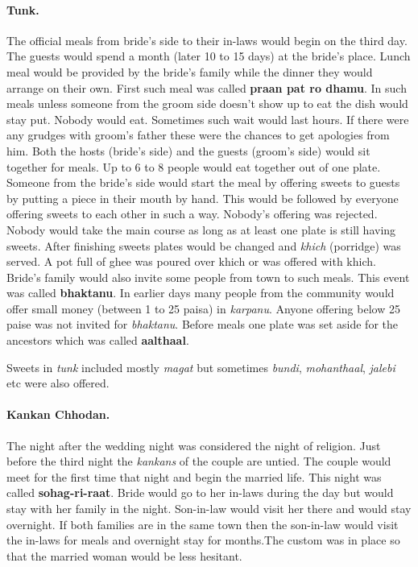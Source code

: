\paragraph{Tunk.} The official meals from bride's side to their in-laws would
begin on the third day. The guests would spend a month (later 10 to 15 days) at
the bride's place. Lunch meal would be provided by the bride's family while the
dinner they would arrange on their own. First such meal was called
\textbf{praan pat ro dhamu}. In such meals unless someone from the groom side
doesn't show up to eat the dish would stay put. Nobody would eat. Sometimes
such wait would last hours. If there were any grudges with groom's father these
were the chances to get apologies from him. Both the hosts (bride's side) and
the guests (groom's side) would sit together for meals. Up to 6 to 8 people
would eat together out of one plate. Someone from the bride's side would start
the meal by offering sweets to guests by putting a piece in their mouth by
hand. This would be followed by everyone offering sweets to each other in such
a way. Nobody's offering was rejected. Nobody would take the main course as
long as at least one plate is still having sweets. After finishing sweets
plates would be changed and \textit{khich} (porridge) was served. A pot full of
ghee was poured over khich or was offered with khich. Bride's family would also
invite some people from town to such meals. This event was called \textbf{bhaktanu}.
In earlier days many people from the community would offer small money (between
1 to 25 paisa) in \textit{karpanu}. Anyone offering below 25 paise was
not invited for \textit{bhaktanu}. Before meals one plate was set aside for the
ancestors which was called \textbf{aalthaal}.

Sweets in \textit{tunk} included mostly \textit{magat} but sometimes
\textit{bundi}, \textit{mohanthaal}, \textit{jalebi} etc were also offered.

\paragraph{Kankan Chhodan.} The night after the wedding night was considered
the night of religion. Just before the third night the \textit{kankans} of the
couple are untied. The couple would meet for the first time that night and
begin the married life. This night was called \textbf{sohag-ri-raat}. Bride
would go to her in-laws during the day but would stay with her family in the
night. Son-in-law would visit her there and would stay overnight. If both
families are in the same town then the son-in-law would visit the in-laws for
meals and overnight stay for months.The custom was in place so that the married
woman would be less hesitant. 

